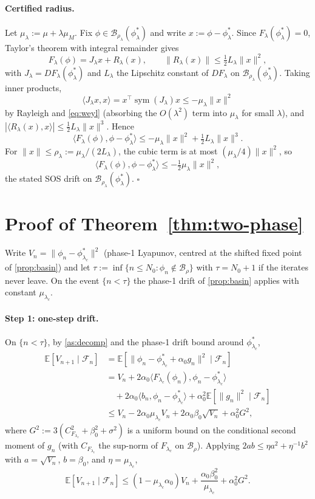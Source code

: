 \documentclass{nextgame2026} %
\newcommand{\E}{\mathbb{E}}
\newcommand{\B}{\mathcal{B}}
\newcommand{\F}{\mathcal{F}}
\begin{document}
\paragraph{Certified radius.}
Let $\mu_\lambda:=\mu+\lambda\mu_M$. Fix $\phi\in\B_{\rho_\lambda}(\phi^\ast_\lambda)$ and write $x:=\phi-\phi^\ast_\lambda$. Since $F_\lambda(\phi^\ast_\lambda)=0$, Taylor's theorem with integral remainder gives
\[
F_\lambda(\phi)=J_\lambda x+R_\lambda(x),\qquad \|R_\lambda(x)\|\le\tfrac{1}{2}L_\lambda\|x\|^2,
\]
with $J_\lambda=DF_\lambda(\phi^\ast_\lambda)$ and $L_\lambda$ the Lipschitz constant of $DF_\lambda$ on $\B_{\rho_\lambda}(\phi^\ast_\lambda)$. Taking inner products,
\[
\langle J_\lambda x,x\rangle=x^\top\operatorname{sym}(J_\lambda)x\le -\mu_\lambda\|x\|^2
\]
by Rayleigh and \eqref{eq:weyl} (absorbing the $O(\lambda^2)$ term into $\mu_\lambda$ for small $\lambda$), and $|\langle R_\lambda(x),x\rangle|\le\tfrac{1}{2}L_\lambda\|x\|^3$. Hence
\[
\langle F_\lambda(\phi),\phi-\phi^\ast_\lambda\rangle\le-\mu_\lambda\|x\|^2+\tfrac{1}{2}L_\lambda\|x\|^3.
\]
For $\|x\|\le\rho_\lambda:=\mu_\lambda/(2L_\lambda)$, the cubic term is at most $(\mu_\lambda/4)\|x\|^2$, so
\[
\langle F_\lambda(\phi),\phi-\phi^\ast_\lambda\rangle\le-\tfrac{1}{2}\mu_\lambda\|x\|^2,
\]
the stated SOS drift on $\B_{\rho_\lambda}(\phi^\ast_\lambda)$. $\square$

\section{Proof of Theorem~\ref{thm:two-phase}}\label{app:thm-twophase}

Write $V_n=\|\phi_n-\phi^\ast_{\lambda_c}\|^2$ (phase-1 Lyapunov, centred at the shifted fixed point of \cref{prop:basin}) and let $\tau:=\inf\{n\le N_0:\phi_n\notin\B_\rho\}$ with $\tau=N_0+1$ if the iterates never leave. On the event $\{n<\tau\}$ the phase-1 drift of \cref{prop:basin} applies with constant $\mu_{\lambda_c}$.

\paragraph{Step 1: one-step drift.}
On $\{n<\tau\}$, by \cref{as:decomp} and the phase-1 drift bound around $\phi^\ast_{\lambda_c}$,
\[
\begin{aligned}
\E[V_{n+1}\mid\F_n]
&=\E\!\left[\|\phi_n-\phi^\ast_{\lambda_c}+\alpha_0 g_n\|^2\mid\F_n\right]\\
&=V_n+2\alpha_0\langle F_{\lambda_c}(\phi_n),\phi_n-\phi^\ast_{\lambda_c}\rangle\\
&\quad+2\alpha_0\langle b_n,\phi_n-\phi^\ast_{\lambda_c}\rangle+\alpha_0^2\E[\|g_n\|^2\mid\F_n]\\
&\le V_n-2\alpha_0\mu_{\lambda_c}V_n
+2\alpha_0\beta_0\sqrt{V_n}+\alpha_0^2 G^2,
\end{aligned}
\]
where $G^2:=3(C_{F_{\lambda_c}}^2+\beta_0^2+\sigma^2)$ is a uniform bound on the conditional second moment of $g_n$ (with $C_{F_{\lambda_c}}$ the sup-norm of $F_{\lambda_c}$ on $\B_\rho$). Applying $2a b\le \eta a^2+\eta^{-1}b^2$ with $a=\sqrt{V_n}$, $b=\beta_0$, and $\eta=\mu_{\lambda_c}$,
\[
\E[V_{n+1}\mid\F_n]\le (1-\mu_{\lambda_c}\alpha_0)V_n
+\frac{\alpha_0\beta_0^2}{\mu_{\lambda_c}}+\alpha_0^2 G^2.
\]
\end{document}
